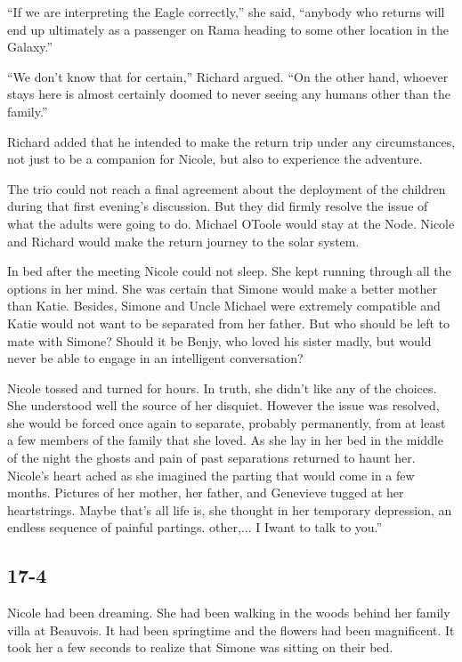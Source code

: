 \documentclass[]{article}
\begin{document}
{“If we are interpreting the Eagle correctly,” she said, “anybody who returns will end up ultimately as a passenger on Rama heading to some other location in the Galaxy.”

“We don’t know that for certain,” Richard argued.  “On the other hand, whoever stays here is almost certainly doomed to never seeing any humans other than the family.”

Richard added that he intended to make the return trip under any circumstances, not just to be a companion for Nicole, but also to experience the adventure.

The trio could not reach a final agreement about the deployment of the children during that first evening’s discussion.  But they did firmly resolve the issue of what the adults were going to do.  Michael OToole would stay at the Node.  Nicole and Richard would make the return journey to the solar system.

In bed after the meeting Nicole could not sleep.  She kept running through all the options in her mind.  She was certain that Simone would make a better mother than Katie.  Besides, Simone and Uncle Michael were extremely compatible and Katie would not want to be separated from her father.  But who should be left to mate with Simone? Should it be Benjy, who loved his sister madly, but would never be able to engage in an intelligent conversation?

Nicole tossed and turned for hours.  In truth, she didn’t like any of the choices.  She understood well the source of her disquiet.  However the issue was resolved, she would be forced once again to separate, probably permanently, from at least a few members of the family that she loved.  As she lay in her bed in the middle of the night the ghosts and pain of past separations returned to haunt her.  Nicole’s heart ached as she imagined the parting that would come in a few months.  Pictures of her mother, her father, and Genevieve tugged at her heartstrings.  Maybe that’s all life is, she thought in her temporary depression, an endless sequence of painful partings.  other,...  I Iwant to talk to you.”

\subsection*{17-4}

Nicole had been dreaming.  She had been walking in the woods behind her family villa at Beauvois.  It had been springtime and the flowers had been magnificent.  It took her a few seconds to realize that Simone was sitting on their bed.

}
\end{document}
